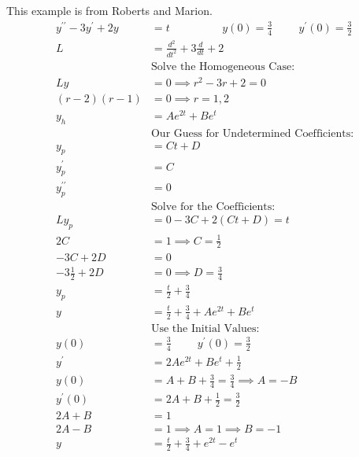 \documentclass[fleqn,letterpaper]{report}
\begin{document}
\begin{example}
This example is from Roberts and Marion.
\begin{align*}
y^{\prime \prime} - 3y^\prime + 2y & = t \hspace{2cm} y(0) =
\frac{3}{4} \hspace{1cm} y^\prime(0) = \frac{3}{2} \\
L & = \frac{d^2}{dt^2} + 3 \frac{d}{dt} + 2 \\
& \text{Solve the Homogeneous Case:} \\
Ly & = 0 \implies r^2 - 3r + 2 = 0 \\
(r-2)(r-1) & = 0 \implies r = 1,2\\
y_h & = A e^{2t} + B e^t \\
& \text{Our Guess for Undetermined Coefficients:} \\
y_p & = Ct + D \\
y_p^\prime & = C \\
y_p^{\prime \prime} & = 0 \\
& \text{Solve for the Coefficients:} \\
L y_p & = 0 - 3C + 2(Ct + D) = t \\
2C & = 1 \implies C = \frac{1}{2} \\
-3C + 2D & = 0 \\
-3 \frac{1}{2} + 2 D & = 0 \implies D =\frac{3}{4} \\
y_p & = \frac{t}{2} + \frac{3}{4} \\
y & = \frac{t}{2} + \frac{3}{4} + A e^{2t} + B e^t \\
& \text{Use the Initial Values:} \\
y(0) & = \frac{3}{4} \hspace{1cm} y^\prime(0) = \frac{3}{2} \\
y^\prime & = 2Ae^{2t} + Be^t + \frac{1}{2} \\
y(0) & = A + B + \frac{3}{4} = \frac{3}{4} \implies A = -B \\
y^\prime(0) & = 2A + B + \frac{1}{2} = \frac{3}{2} \\
2A + B & = 1 \\
2A - B & = 1 \implies A = 1 \implies B = -1 \\
y & = \frac{t}{2} + \frac{3}{4} + e^{2t} - e^t 
\end{align*}
\end{example}
\end{document}
